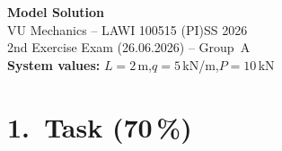 \documentclass[a4paper,11pt]{article}
\begin{document}

\begin{center}
  {\Large\bfseries Model Solution}\\[4pt]
  {\large VU Mechanics -- LAWI 100515 (PI)\quad SS 2026}\\[2pt]
  {\normalsize 2nd Exercise Exam (26.06.2026) -- Group~A}\\[2pt]
  {\normalsize \textbf{System values:} $L = 2$\,m,\quad $q = 5$\,kN/m,\quad $P = 10$\,kN}
\end{center}

\section*{1.~Task \hfill (70\,\%)}
\end{document}
